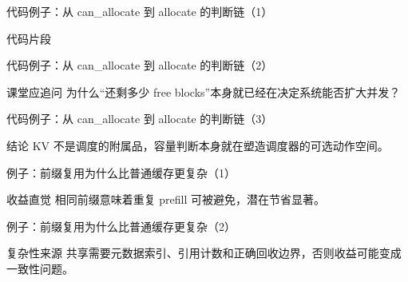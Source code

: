 \begin{frame}{代码例子：从 can\_allocate 到 allocate 的判断链（1）}
\begin{block}{代码片段}
    {\ttfamily\small
    \par
    \par
    \par
    }
  \end{block}
\end{frame}

\begin{frame}{代码例子：从 can\_allocate 到 allocate 的判断链（2）}
\begin{block}{课堂应追问}
    为什么“还剩多少 free blocks”本身就已经在决定系统能否扩大并发？
  \end{block}
\end{frame}

\begin{frame}{代码例子：从 can\_allocate 到 allocate 的判断链（3）}
\begin{block}{结论}
    KV 不是调度的附属品，容量判断本身就在塑造调度器的可选动作空间。
  \end{block}
\end{frame}

\begin{frame}{例子：前缀复用为什么比普通缓存更复杂（1）}
\begin{block}{收益直觉}
    相同前缀意味着重复 prefill 可被避免，潜在节省显著。
  \end{block}
\end{frame}

\begin{frame}{例子：前缀复用为什么比普通缓存更复杂（2）}
\begin{block}{复杂性来源}
    共享需要元数据索引、引用计数和正确回收边界，否则收益可能变成一致性问题。
  \end{block}
\end{frame}

